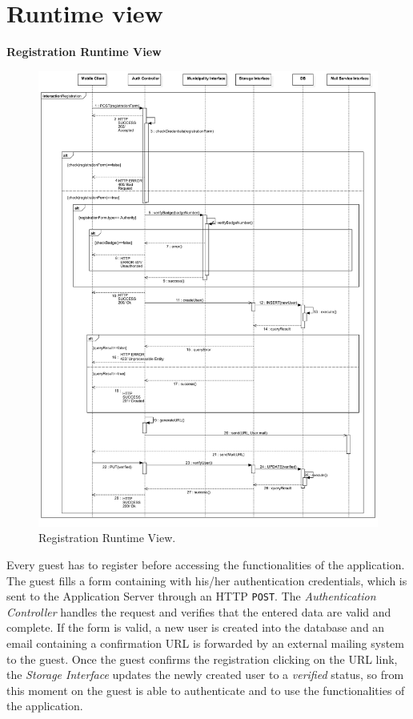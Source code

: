 \documentclass{report}
\begin{document}
\section{Runtime view}
\begin{center}\large{\textbf{Registration Runtime View}}\end{center}
\begin{figure}[H]
	\begin{center}
	\includegraphics[width=.9\textwidth]{img/Registrationn.pdf}
    \end{center}
    \label{fig:RegistrationSD}
	\caption{Registration Runtime View.}
\end{figure}
\clearpage
\noindent Every guest has to register before accessing the functionalities of the application. The guest fills a form containing with his/her authentication credentials, which is sent to the Application Server through an HTTP \texttt{POST}. The \textit{Authentication Controller} handles the request and verifies that the entered data are valid and complete. If the form is valid, a new user is created into the database and an email containing a confirmation URL is forwarded by an external mailing system to the guest. Once the guest confirms the registration clicking on the URL link, the \textit{Storage Interface} updates the newly created user to a \textit{verified} status, so from this moment on the guest is able to authenticate and to use the functionalities of the application.
\end{document}
